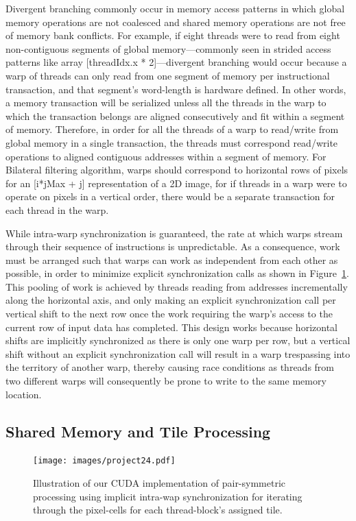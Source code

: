 \documentclass{IEEEtran}
\begin{document}
Divergent branching commonly occur in memory access patterns in which global memory operations are not coalesced and shared memory operations are not free of memory bank conflicts. For example, if eight threads were to read from eight non-contiguous segments of global memory---commonly seen in strided access patterns like array {[}threadIdx.x {*} 2{]}---divergent branching would occur because a warp of threads can only read from one segment of memory per instructional transaction, and that segment's word-length is hardware defined. In other words, a memory transaction will be serialized unless all the threads in the warp to which the transaction belongs are aligned consecutively and fit within a segment of memory. Therefore, in order for all the threads of a warp to read/write from global memory in a single transaction, the threads must correspond read/write operations to aligned contiguous addresses within a segment of memory. For Bilateral filtering algorithm, warps should correspond to horizontal rows of pixels for an [i*jMax + j] representation of a 2D image, for if threads in a warp were to operate on pixels in a vertical order, there would be a separate transaction for each thread in the warp.

While intra-warp synchronization is guaranteed, the rate at which warps stream through their sequence of instructions is unpredictable. As a consequence, work must be arranged such that warps can work as independent from each other as possible, in order to minimize explicit synchronization calls as shown in Figure~\ref{fig:pspro}. This pooling of work is achieved by threads reading from addresses incrementally along the horizontal axis, and only making an explicit synchronization call per vertical shift to the next row once the work requiring the warp's access to the current row of input data has completed. This design works because horizontal shifts are implicitly synchronized as there is only one warp per row, but a vertical shift without an explicit synchronization call will result in a warp trespassing into the territory of another warp, thereby causing race conditions as threads from two different warps will consequently be prone to write to the same memory location. 

\subsection{Shared Memory and Tile Processing}
\begin{figure}
\texttt{[image: images/project24.pdf]}
\caption{Illustration of our CUDA implementation of pair-symmetric processing using implicit intra-wap synchronization for iterating through the pixel-cells for each thread-block's assigned tile.}
\label{fig:pspro}
\end{figure}
\end{document}
